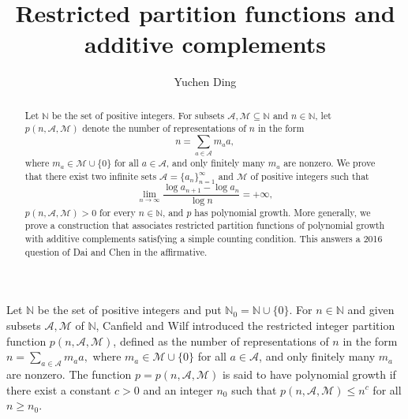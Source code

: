 \documentclass[12pt,a4paper,reqno]{amsart}
\numberwithin{equation}{section}
\def\N{{\mathbb N}}
\theoremstyle{plain}
\theoremstyle{definition}
\begin{document}
\title
[Restricted partition functions and additive complements]
{Restricted partition functions and additive complements}

\author
[Y. Ding] {Yuchen Ding}

\address{(Yuchen Ding$^{1,2}$) $^1$School of Mathematics, Yangzhou University, Yangzhou 225002, People's Republic of China}
\address{$^2$HUN-REN Alfr\'ed R\'enyi Institute of Mathematics, Budapest, Pf. 127, H-1364 Hungary}



\begin{abstract}
Let $\N$ be the set of positive integers. For subsets $\mathcal{A},\mathcal{M}\subseteq \N$ and $n\in \N$, let $p(n,\mathcal{A},\mathcal{M})$ denote the number of representations of $n$ in the form
$$
n=\sum_{a\in \mathcal{A}}m_a a,
$$
where $m_a\in \mathcal{M}\cup \{0\}$ for all $a\in \mathcal{A}$, and only finitely many $m_a$ are nonzero. We prove that there exist two infinite sets $\mathcal{A}=\{a_n\}_{n=1}^{\infty}$ and $\mathcal{M}$ of positive integers such that
$$
\lim_{n\to\infty}\frac{\log a_{n+1}-\log a_n}{\log n}=+\infty,
$$
$p(n,\mathcal{A},\mathcal{M})>0$ for every $n\in\N$, and $p$ has polynomial growth. More generally, we prove a construction that associates restricted partition functions of polynomial growth with additive complements satisfying a simple counting condition. This answers a 2016 question of Dai and Chen in the affirmative.
\end{abstract}
\maketitle

Let $\N$ be the set of positive integers and put $\N_0=\N\cup\{0\}$. For $n\in \N$ and given subsets $\mathcal{A},\mathcal{M}$ of $\N$, Canfield and Wilf \cite{CW12} introduced the restricted integer partition function $p(n,\mathcal{A},\mathcal{M})$, defined as the number of representations of $n$ in the form
$
n=\sum_{a\in \mathcal{A}}m_a a,
$
where $m_a\in \mathcal{M}\cup \{0\}$ for all $a\in \mathcal{A}$, and only finitely many $m_a$ are nonzero. The function $p=p(n,\mathcal{A},\mathcal{M})$ is said to have polynomial growth if there exist a constant $c>0$ and an integer $n_0$ such that $p(n,\mathcal{A},\mathcal{M})\le n^c$ for all $n\ge n_0$.
\end{document}
